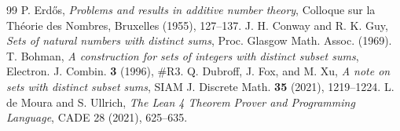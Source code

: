 \documentclass[11pt,a4paper]{article}
\theoremstyle{definition}
\begin{document}
\begin{thebibliography}{99}
 P. Erd\H{o}s, \textit{Problems and results in additive number theory}, Colloque sur la Th\'eorie des Nombres, Bruxelles (1955), 127--137.
 J. H. Conway and R. K. Guy, \textit{Sets of natural numbers with distinct sums}, Proc. Glasgow Math. Assoc. (1969).
 T. Bohman, \textit{A construction for sets of integers with distinct subset sums}, Electron. J. Combin. \textbf{3} (1996), \#R3.
 Q. Dubroff, J. Fox, and M. Xu, \textit{A note on sets with distinct subset sums}, SIAM J. Discrete Math. \textbf{35} (2021), 1219--1224.
 L. de Moura and S. Ullrich, \textit{The Lean 4 Theorem Prover and Programming Language}, CADE 28 (2021), 625--635.
\end{thebibliography}
\end{document}
